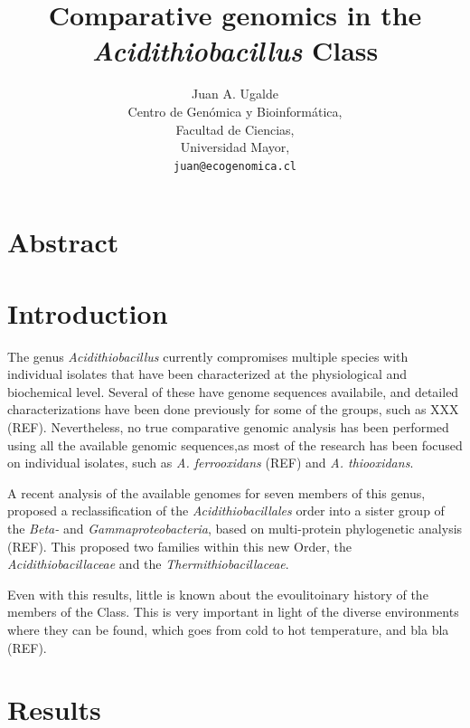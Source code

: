 \documentclass[11pt]{article}
\begin{document}
\title{Comparative genomics in the \textit{Acidithiobacillus} Class}

\author{Juan A. Ugalde\\
Centro de Gen\'omica y Bioinform\'atica, \\
Facultad de Ciencias, \\
Universidad Mayor, \\
\texttt{juan@ecogenomica.cl}
}

\maketitle

\section*{Abstract}

\section*{Introduction}

The genus \textit{Acidithiobacillus} currently compromises multiple species with individual isolates that have been characterized at the physiological and biochemical level. Several of these have genome sequences availabile, and detailed characterizations have been done previously for some of the groups, such as XXX (REF). Nevertheless, no true comparative genomic analysis has been performed using all the available genomic sequences,as most of the research has been focused on individual isolates, such as \textit{A. ferrooxidans} (REF) and \textit{A. thiooxidans}.

A recent analysis of the available genomes for seven members of this genus, proposed a reclassification of the \textit{Acidithiobacillales} order into a sister group of the \textit{Beta-} and \textit{Gammaproteobacteria}, based on multi-protein phylogenetic analysis (REF). This proposed two families within this new Order, the \textit{Acidithiobacillaceae} and the \textit{Thermithiobacillaceae}. 

Even with this results, little is known about the evoulitoinary history of the members of the Class. This is very important in light of the diverse environments where they can be found, which goes from cold to hot temperature, and bla bla (REF).

\section*{Results}
\end{document}
